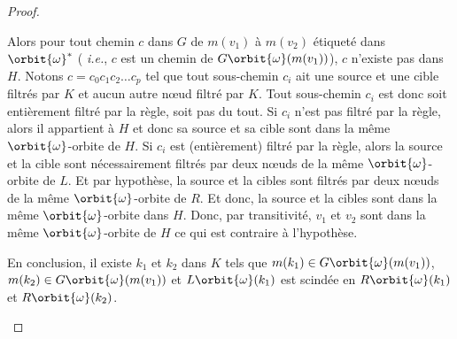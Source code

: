 \begin{proof}
\begin{enumerate}
		      Alors pour tout chemin $c$ dans $G$ de $m(v_1)$
		      à $m(v_2)$ étiqueté dans $\orbit{\omega}^*$ ( \textit{i.e.}, $c$ est un
		      chemin de $G\orbit{\omega}(m(v_1))$), $c$ n'existe pas dans $H$. %
		      Notons $c = c_0 c_1 c_2 \ldots c_p$ tel que tout sous-chemin $c_i$ ait une source et une cible filtrés par $K$ et aucun autre n\oe ud filtré par $K$. %
		      Tout sous-chemin $c_i$ est donc soit entièrement filtré par la règle, soit pas du tout. %
		      Si $c_i$ n'est pas filtré par la règle, alors il appartient à $H$ et donc sa source et sa cible sont dans la même $\orbit{\omega}$-orbite de $H$. %
		      Si $c_i$ est (entièrement) filtré par la règle, alors la source et la cible sont nécessairement filtrés par deux n\oe uds de la même $\orbit{\omega}$-orbite de $L$. %
		      Et par hypothèse, la source et la cibles sont filtrés par deux n\oe uds de la même $\orbit{\omega}$-orbite de $R$. %
		      Et donc, la source et la cibles sont dans la même $\orbit{\omega}$-orbite dans $H$. %
		      Donc, par transitivité, $v_1$ et $v_2$ sont dans la même $\orbit{\omega}$-orbite de $H$ ce qui est contraire à l'hypothèse. %

		      En conclusion, il existe $k_1$ et $k_2$ dans $K$ tels que $m(k_1) \in G\orbit{\omega}(m(v_1))$, $m(k_2) \in G\orbit{\omega}(m(v_1))$ et $L\orbit{\omega}(k_1)$ est scindée en $R\orbit{\omega}(k_1)$ et $R\orbit{\omega}(k_2)$. %







	\end{enumerate}
\end{proof}


